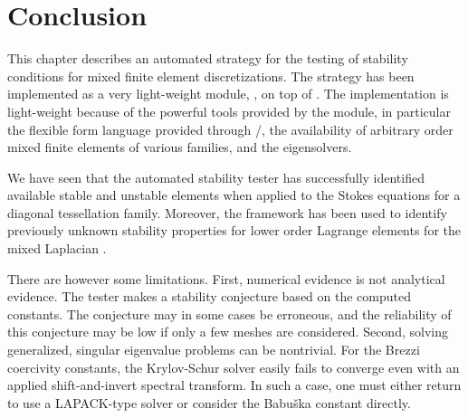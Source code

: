 \section{Conclusion}
\label{rognes:sec:conclusion}

This chapter describes an automated strategy for the testing of stability
conditions for mixed finite element discretizations. The strategy has
been implemented as a very light-weight \rognespython{} module,
\rognesascot{}, on top of \pydolfin{}. The implementation is
light-weight because of the powerful tools provided by the \pydolfin{}
module, in particular the flexible form language provided through
\ufl{}/\ffc{}, the availability of arbitrary order mixed finite
elements of various families, and the \slepc{} eigensolvers.

We have seen that the automated stability tester has successfully
identified available stable and unstable elements when applied to the
Stokes equations for a diagonal tessellation family. Moreover, the
framework has been used to identify previously unknown stability
properties for lower order Lagrange elements for the mixed
Laplacian \citep{ArnoldRognes2009}.

There are however some limitations. First, numerical evidence is not
analytical evidence. The tester makes a stability conjecture based on
the computed constants. The conjecture may in some cases be erroneous,
and the reliability of this conjecture may be low if only a few meshes
are considered. Second, solving generalized, singular eigenvalue
problems can be nontrivial. For the Brezzi coercivity constants, the
Krylov-Schur solver easily fails to converge even with an applied
shift-and-invert spectral transform. In such a case, one must either
return to use a LAPACK-type solver or consider the Babu\v ska constant
directly.
